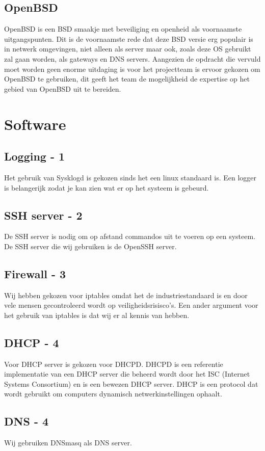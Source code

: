 \documentclass[12pt]{article}
\begin{document}
\subsection{OpenBSD}
OpenBSD is een BSD smaakje met beveiliging en openheid als voornaamste uitgangspunten. Dit is de voornaamste rede dat deze BSD versie erg populair is in netwerk omgevingen, niet alleen als server maar ook, zoals deze OS gebruikt zal gaan worden, als gateways en DNS servers. Aangezien de opdracht die vervuld moet worden geen enorme uitdaging is voor het projectteam is ervoor gekozen om OpenBSD te gebruiken, dit geeft het team de mogelijkheid de expertise op het gebied van OpenBSD uit te bereiden.
\clearpage
\section{Software}
\subsection{Logging - 1}
Het gebruik van Sysklogd is gekozen sinds het een linux standaard is. Een logger is belangerijk zodat je kan zien wat er op het systeem is gebeurd.
\subsection{SSH server - 2}
De SSH server is nodig om op afstand commandos uit te voeren op een systeem. De SSH server die wij gebruiken is de OpenSSH server.
\subsection{Firewall - 3}
Wij hebben gekozen voor iptables omdat het de industriestandaard is en door vele mensen gecontroleerd wordt op veiligheidsrisisco's. Een ander argument voor het gebruik van iptables is dat wij er al kennis van hebben.
\subsection{DHCP - 4}
Voor DHCP server is gekozen voor DHCPD. DHCPD is een referentie implementatie van een DHCP server die beheerd wordt door het ISC (Internet Systems Consortium) en is een bewezen DHCP server. DHCP is een protocol dat wordt gebruikt om computers dynamisch netwerkinstellingen ophaalt.
\subsection{DNS - 4}
Wij gebruiken DNSmasq als DNS server.
\end{document}
